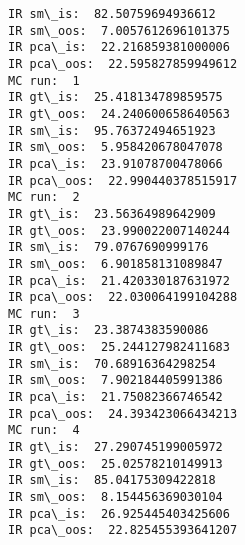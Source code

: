 \documentclass[11pt]{article}
\begin{document}
    \begin{Verbatim}[commandchars=\\\{\},fontsize=\footnotesize]
IR sm\_is:  82.50759694936612
IR sm\_oos:  7.0057612696101375
IR pca\_is:  22.216859381000006
IR pca\_oos:  22.595827859949612
MC run:  1
IR gt\_is:  25.418134789859575
IR gt\_oos:  24.240600658640563
IR sm\_is:  95.76372494651923
IR sm\_oos:  5.958420678047078
IR pca\_is:  23.91078700478066
IR pca\_oos:  22.990440378515917
MC run:  2
IR gt\_is:  23.56364989642909
IR gt\_oos:  23.990022007140244
IR sm\_is:  79.0767690999176
IR sm\_oos:  6.901858131089847
IR pca\_is:  21.420330187631972
IR pca\_oos:  22.030064199104288
MC run:  3
IR gt\_is:  23.3874383590086
IR gt\_oos:  25.244127982411683
IR sm\_is:  70.68916364298254
IR sm\_oos:  7.902184405991386
IR pca\_is:  21.75082366746542
IR pca\_oos:  24.393423066434213
MC run:  4
IR gt\_is:  27.290745199005972
IR gt\_oos:  25.02578210149913
IR sm\_is:  85.04175309422818
IR sm\_oos:  8.154456369030104
IR pca\_is:  26.925445403425606
IR pca\_oos:  22.825455393641207

    \end{Verbatim}
\end{document}
